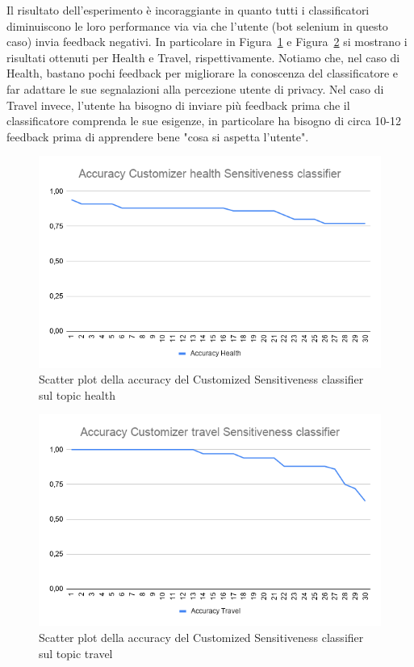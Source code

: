 Il risultato dell'esperimento è incoraggiante in quanto tutti i classificatori diminuiscono le loro performance via via che l'utente (bot selenium in questo caso) invia feedback negativi. In particolare in Figura~\ref{fig:plot_acc-health} e Figura~\ref{fig:plot_acc-travel} si mostrano i risultati ottenuti per Health e Travel, rispettivamente. Notiamo che, nel caso di Health, bastano pochi feedback per migliorare la conoscenza del classificatore e far adattare le sue segnalazioni alla percezione utente di privacy. Nel caso di Travel invece, l'utente ha bisogno di inviare più feedback prima che il classificatore comprenda le sue esigenze, in particolare ha bisogno di circa 10-12 feedback prima di apprendere bene "cosa si aspetta l'utente".

\begin{figure}[h!t]
    \centering
    \includegraphics[width=15cm]{Figure/qualitativa/Custom_health-Sens.png}
    \caption{Scatter plot della accuracy del Customized Sensitiveness classifier sul topic health}
    \label{fig:plot_acc-health}
\end{figure}
\FloatBarrier

\begin{figure}[h!t]
    \centering
    \includegraphics[width=15cm]{Figure/qualitativa/Customizer_travel-Sens.png}
    \caption{Scatter plot della accuracy del Customized Sensitiveness classifier sul topic travel}
    \label{fig:plot_acc-travel}
\end{figure}
\FloatBarrier

